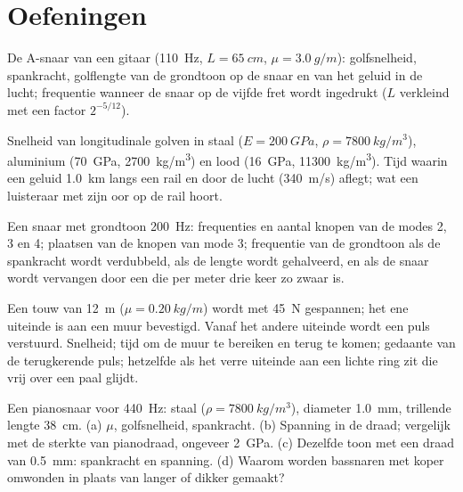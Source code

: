 \section{Oefeningen}

\begin{exercise}[$\star$]\label{exo:b2:waves-on-strings:1}
De A-snaar van een gitaar (\qty{110}{Hz}, $L = \qty{65}{cm}$,
$\mu = \qty{3.0}{g/m}$): golfsnelheid, spankracht, golflengte van de
grondtoon op de snaar en van het geluid in de lucht; frequentie wanneer de
snaar op de vijfde fret wordt ingedrukt ($L$ verkleind met een factor
$2^{-5/12}$).
\end{exercise}

\begin{exercise}[$\star$]\label{exo:b2:waves-on-strings:2}
Snelheid van longitudinale golven in staal ($E = \qty{200}{GPa}$,
$\rho =
\qty{7800}{kg/m^3}$), aluminium (\qty{70}{GPa}, \qty{2700}{kg/m^3})
en lood (\qty{16}{GPa}, \qty{11300}{kg/m^3}). Tijd waarin een geluid
\qty{1.0}{km} langs een rail en door de lucht (\qty{340}{m/s}) aflegt; wat
een luisteraar met zijn oor op de rail hoort.
\end{exercise}

\begin{exercise}[$\star$]\label{exo:b2:waves-on-strings:3}
Een snaar met grondtoon \qty{200}{Hz}: frequenties en aantal knopen van de
modes 2, 3 en 4; plaatsen van de knopen van mode 3; frequentie van de
grondtoon als de spankracht wordt verdubbeld, als de lengte wordt
gehalveerd, en als de snaar wordt vervangen door een die per meter drie keer
zo zwaar is.
\end{exercise}

\begin{exercise}[$\star$]\label{exo:b2:waves-on-strings:4}
Een touw van \qty{12}{m} ($\mu = \qty{0.20}{kg/m}$) wordt met \qty{45}{N}
gespannen; het ene uiteinde is aan een muur bevestigd. Vanaf het andere
uiteinde wordt een puls verstuurd. Snelheid; tijd om de muur te bereiken en
terug te komen; gedaante van de terugkerende puls; hetzelfde als het verre
uiteinde aan een lichte ring zit die vrij over een paal glijdt.
\end{exercise}

\begin{exercise}[$\star\star$]\label{exo:b2:waves-on-strings:5}
Een pianosnaar voor \qty{440}{Hz}: staal ($\rho = \qty{7800}{kg/m^3}$),
diameter \qty{1.0}{mm}, trillende lengte \qty{38}{cm}. (a) $\mu$,
golfsnelheid, spankracht. (b) Spanning in de draad; vergelijk met de sterkte
van pianodraad, ongeveer \qty{2}{GPa}. (c) Dezelfde toon met een draad van
\qty{0.5}{mm}: spankracht en spanning. (d) Waarom worden bassnaren met koper
omwonden in plaats van langer of dikker gemaakt?
\end{exercise}


